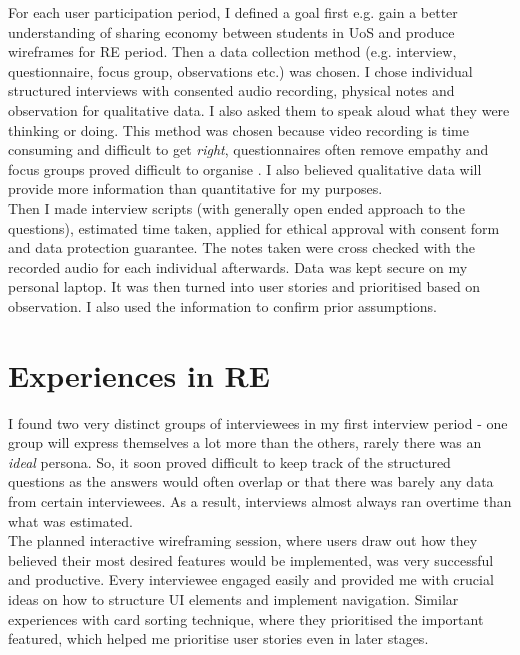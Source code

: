 For each user participation period, I defined a goal first e.g. gain a better understanding of sharing economy between students in UoS and produce wireframes for RE period. Then a data collection method (e.g. interview, questionnaire, focus group, observations etc.) was chosen. I chose individual structured interviews with consented audio recording, physical notes and observation for qualitative data. I also asked them to speak aloud what they were thinking or doing. This method was chosen because video recording is time consuming and difficult to get \textit{right}, questionnaires often remove empathy and focus groups proved difficult to organise \cite{Arhippainen:2003}. I also believed qualitative data will provide more information than quantitative for my purposes.\\

Then I made interview scripts (with generally open ended approach to the questions), estimated time taken, applied for ethical approval with consent form and data protection guarantee. The notes taken were cross checked with the recorded audio for each individual afterwards. Data was kept secure on my personal laptop. It was then turned into user stories and prioritised based on observation. I also used the information to confirm prior assumptions.

\section{Experiences in RE}

I found two very distinct groups of interviewees in my first interview period - one group will express themselves a lot more than the others, rarely there was an \textit{ideal} persona. So, it soon proved difficult to keep track of the structured questions as the answers would often overlap or that there was barely any data from certain interviewees. As a result, interviews almost always ran overtime than what was estimated.\\

The planned interactive wireframing session, where users draw out how they believed their most desired features would be implemented, was very successful and productive. Every interviewee engaged easily and provided me with crucial ideas on how to structure UI elements and implement navigation. Similar experiences with card sorting technique, where they prioritised the important featured, which helped me prioritise user stories even in later stages.\\

